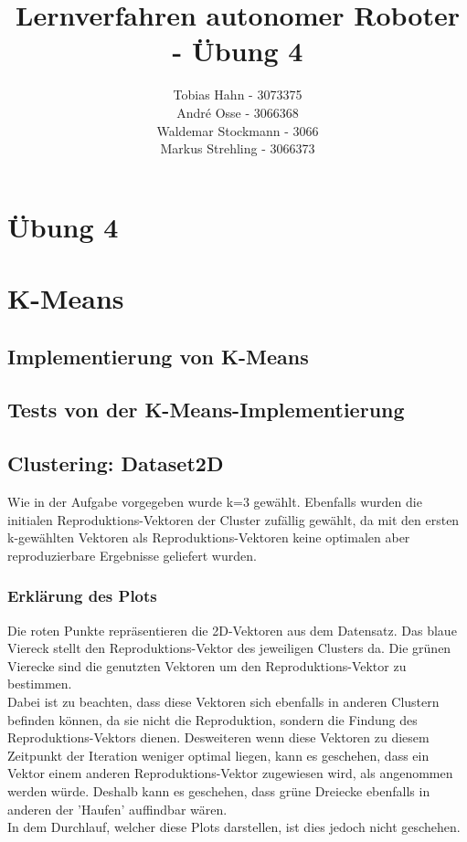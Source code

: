 \documentclass{article}
\title{Lernverfahren autonomer Roboter - Übung 4}
\author{Tobias Hahn - 3073375 \\ André Osse - 3066368\\Waldemar Stockmann - 3066\\Markus Strehling - 3066373}
\begin{document}
\maketitle
\newpage
\section*{Übung 4}
\section{K-Means}

\subsection{Implementierung von K-Means}


\subsection{Tests von der K-Means-Implementierung}


\subsection{Clustering: Dataset2D}
Wie in der Aufgabe vorgegeben wurde k=3 gewählt. Ebenfalls wurden die initialen Reproduktions-Vektoren der Cluster zufällig gewählt, da mit den ersten k-gewählten Vektoren als Reproduktions-Vektoren keine optimalen aber reproduzierbare Ergebnisse geliefert wurden.

\subsubsection{Erklärung des Plots}
Die roten Punkte repräsentieren die 2D-Vektoren aus dem Datensatz. Das blaue Viereck stellt den Reproduktions-Vektor des jeweiligen Clusters da. Die grünen Vierecke sind die genutzten Vektoren um den Reproduktions-Vektor zu bestimmen.\\
Dabei ist zu beachten, dass diese Vektoren sich ebenfalls in anderen Clustern befinden können, da sie nicht die Reproduktion, sondern die Findung des Reproduktions-Vektors dienen. Desweiteren wenn diese Vektoren zu diesem Zeitpunkt der Iteration weniger optimal liegen, kann es geschehen, dass ein Vektor einem anderen Reproduktions-Vektor zugewiesen wird, als angenommen werden würde. Deshalb kann es geschehen, dass grüne Dreiecke ebenfalls in anderen der 'Haufen' auffindbar wären.\\
In dem Durchlauf, welcher diese Plots darstellen, ist dies jedoch nicht geschehen.
\end{document}
